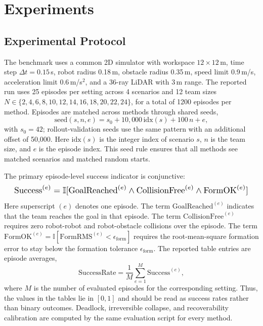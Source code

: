 \documentclass{ieeeaccess}
\begin{document}
\section{Experiments}
\label{sec:experiments}

\subsection{Experimental Protocol}
The benchmark uses a common 2D simulator with workspace
$12\times12$\,m, time step $\Delta t = 0.15$\,s, robot radius 0.18\,m,
obstacle radius 0.35\,m, speed limit 0.9\,m/s, acceleration limit
0.6\,m/s$^2$, and a 36-ray LiDAR with 3\,m range. The reported run uses
25 episodes per setting across 4 scenarios and 12 team sizes
$N\in\{2,4,6,8,10,12,14,16,18,20,22,24\}$, for a total of 1200
episodes per method. Episodes are matched across methods
through shared seeds,
\begin{equation}
\mathrm{seed}(s,n,e)=s_0 + 10{,}000\,\mathrm{idx}(s) + 100\,n + e,
\label{eq:eval_seed}
\end{equation}
with $s_0=42$; rollout-validation seeds use the same pattern with an
additional offset of 50{,}000. Here $\mathrm{idx}(s)$ is the integer
index of scenario $s$, $n$ is the team size, and $e$ is the episode
index. This seed rule ensures that all methods see matched scenarios
and matched random starts.

The primary episode-level success indicator is conjunctive:
\begin{equation}
\resizebox{0.96\columnwidth}{!}{$\displaystyle
\mathrm{Success}^{(e)}
= \mathbb{I}[\mathrm{GoalReached}^{(e)}\wedge \mathrm{CollisionFree}^{(e)}\wedge \mathrm{FormOK}^{(e)}]
$}
\label{eq:success_metric}
\end{equation}
Here superscript $(e)$ denotes one episode. The term
$\mathrm{GoalReached}^{(e)}$ indicates that the team reaches the goal
in that episode. The term $\mathrm{CollisionFree}^{(e)}$ requires zero
robot-robot and robot-obstacle collisions over the episode. The term
$\mathrm{FormOK}^{(e)}=\mathbb{I}[\mathrm{FormRMS}^{(e)}<\epsilon_{\mathrm{form}}]$
requires the root-mean-square formation error to stay below the
formation tolerance $\epsilon_{\mathrm{form}}$. The reported table
entries are episode averages,
\begin{equation}
\mathrm{SuccessRate}=\frac{1}{M}\sum_{e=1}^{M}\mathrm{Success}^{(e)},
\label{eq:success_rate}
\end{equation}
where $M$ is the number of evaluated episodes for the corresponding
setting. Thus, the values in the tables lie in $[0,1]$ and should be
read as success rates rather than binary outcomes. Deadlock,
irreversible collapse, and recoverability calibration are computed by
the same evaluation script for every method.
\end{document}
